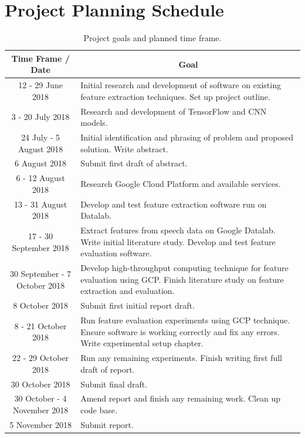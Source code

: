 \chapter{Project Planning Schedule}
\makeatletter{}\makeatother

\begin{table}[!ht]
    \mytable
    \caption{Project goals and planned time frame.}
    \begin{tabularx}{\linewidth}{@{} c  X @{}}
        \toprule
        Time Frame / Date  & \multicolumn{1}{c}{Goal} \\
        \midrule
        12 - 29 June 2018 & Initial research and development of software on existing feature extraction techniques. Set up project outline. \\
        \midrule
        3 - 20 July 2018 & Research and development of TensorFlow and CNN models. \\
        \midrule
        24 July - 5 August 2018 & Initial identification and phrasing of problem and proposed solution. Write abstract. \\
        \midrule
        6 August 2018 & Submit first draft of abstract. \\
        \midrule
        6 - 12 August 2018 & Research Google Cloud Platform and available services. \\
        \midrule
        13 - 31 August 2018 & Develop and test feature extraction software run on Datalab. \\
        \midrule
        17 - 30 September 2018 & Extract features from speech data on Google Datalab. Write initial literature study. Develop and test feature evaluation software. \\
        \midrule
        30 September - 7 October 2018 & Develop high-throughput computing technique for feature evaluation using GCP. Finish literature study on feature extraction and evaluation. \\
        \midrule
        8 October 2018 & Submit first initial report draft. \\
        \midrule
        8 - 21 October 2018 & Run feature evaluation experiments using GCP technique. Ensure software is working correctly and fix any errors. Write experimental setup chapter. \\
        \midrule
        22 - 29 October 2018 & Run any remaining experiments. Finish writing first full draft of report. \\
        \midrule
        30 October 2018 & Submit final draft. \\
        \midrule
        30 October - 4 November 2018 & Amend report and finish any remaining work. Clean up code base. \\
        \midrule
        5 November 2018 & Submit report. \\
        \bottomrule
    \end{tabularx}
    \label{tbl:schedule}
\end{table}

